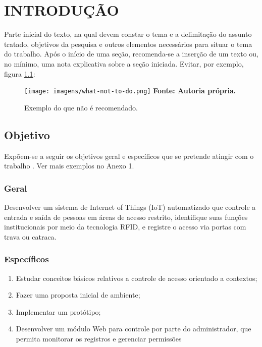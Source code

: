 \chapter{INTRODUÇÃO}\label{chp:INTRODUCAO}

Parte inicial do texto, na qual devem constar o tema e a delimitação do assunto tratado, objetivos da pesquisa e outros elementos necessários para situar o tema do trabalho. Após o início de uma seção, recomenda-se a inserção de um texto ou, no mínimo, uma nota explicativa sobre a seção iniciada. Evitar, por exemplo, figura \ref{fig:WhatNotToDo}:

\begin{figure}[htb]
	\centering
	\caption{Exemplo do que não é recomendado.}
	\texttt{[image: imagens/what-not-to-do.png]} 
	\newline \footnotesize \textbf{Fonte: Autoria própria.}
	\label{fig:WhatNotToDo}
\end{figure}

\section{Objetivo}\label{sec:OBJETIVOS}
Expõem-se a seguir os objetivos geral e específicos que se pretende atingir com o trabalho . Ver mais exemplos no Anexo 1. 

\subsection{Geral}\label{sec:Geral}
Desenvolver um sistema de Internet of Things (IoT) automatizado que controle a entrada e saída de pessoas em áreas de acesso restrito, identifique suas funções institucionais por meio da tecnologia RFID, e registre o acesso via portas com trava ou catraca.


\subsection{Específicos}\label{sec:Especificos}
\begin{enumerate}
	\item Estudar conceitos básicos relativos a controle de acesso orientado a contextos; 
	
	\item Fazer uma proposta inicial de ambiente;
	
	\item Implementar um protótipo;
	
	\item Desenvolver um módulo Web para controle por parte do administrador, que permita monitorar os registros e gerenciar permissões
\end{enumerate}


